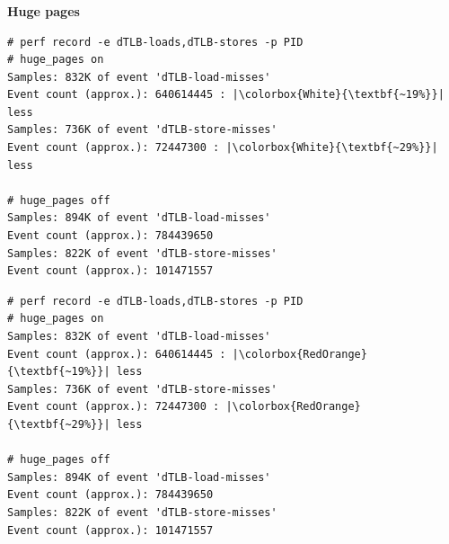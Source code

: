 \documentclass[usenames,dvipsnames, 18pt, compress, aspectratio=169]{beamer}
\begin{document}
\begin{frame}[fragile]{}
    \frametitle{}
    \begin{center}
        \textbf{Huge pages}

    \begin{overprint}
        \begin{flushleft}
        \begin{verbatim}
# perf record -e dTLB-loads,dTLB-stores -p PID
# huge_pages on
Samples: 832K of event 'dTLB-load-misses'
Event count (approx.): 640614445 : |\colorbox{White}{\textbf{~19%}}| less
Samples: 736K of event 'dTLB-store-misses'
Event count (approx.): 72447300 : |\colorbox{White}{\textbf{~29%}}| less

# huge_pages off
Samples: 894K of event 'dTLB-load-misses'
Event count (approx.): 784439650
Samples: 822K of event 'dTLB-store-misses'
Event count (approx.): 101471557
        \end{verbatim}
        \end{flushleft}

        \begin{flushleft}
        \begin{verbatim}
# perf record -e dTLB-loads,dTLB-stores -p PID
# huge_pages on
Samples: 832K of event 'dTLB-load-misses'
Event count (approx.): 640614445 : |\colorbox{RedOrange}{\textbf{~19%}}| less
Samples: 736K of event 'dTLB-store-misses'
Event count (approx.): 72447300 : |\colorbox{RedOrange}{\textbf{~29%}}| less

# huge_pages off
Samples: 894K of event 'dTLB-load-misses'
Event count (approx.): 784439650
Samples: 822K of event 'dTLB-store-misses'
Event count (approx.): 101471557
        \end{verbatim}
        \end{flushleft}

    \end{overprint}
    \end{center}
\end{frame}
\end{document}
